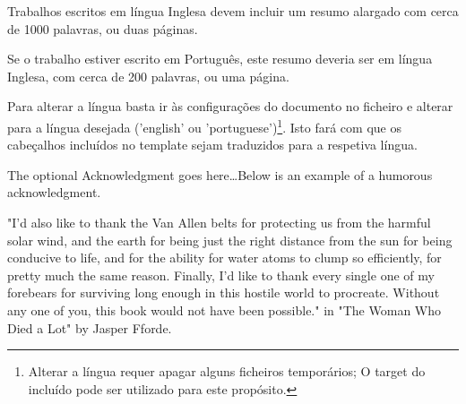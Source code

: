 \begin{abstractotherlanguage}

Trabalhos escritos em língua Inglesa devem incluir um resumo alargado com cerca de 1000 palavras, ou duas páginas.

Se o trabalho estiver escrito em Português, este resumo deveria ser em língua Inglesa, com cerca de 200 palavras, ou uma página.

Para alterar a língua basta ir às configurações do documento no ficheiro  e alterar para a língua desejada ('english' ou 'portuguese')\footnote{Alterar a língua requer apagar alguns ficheiros temporários; O target  do  incluído pode ser utilizado para este propósito.}. Isto fará com que os cabeçalhos incluídos no template sejam traduzidos para a respetiva língua.

\end{abstractotherlanguage}


\begin{acknowledgements}

The optional Acknowledgment goes here\ldots Below is an example of a humorous acknowledgment.

"I'd also like to thank the Van Allen belts for protecting us from the harmful solar wind, and the earth for being just the right distance from the sun for being conducive to life, and for the ability for water atoms to clump so efficiently, for pretty much the same reason. Finally, I'd like to thank every single one of my forebears for surviving long enough in this hostile world to procreate. Without any one of you, this book would not have been possible." in "The Woman Who Died a Lot" by Jasper Fforde.
\end{acknowledgements}


\tableofcontents %

